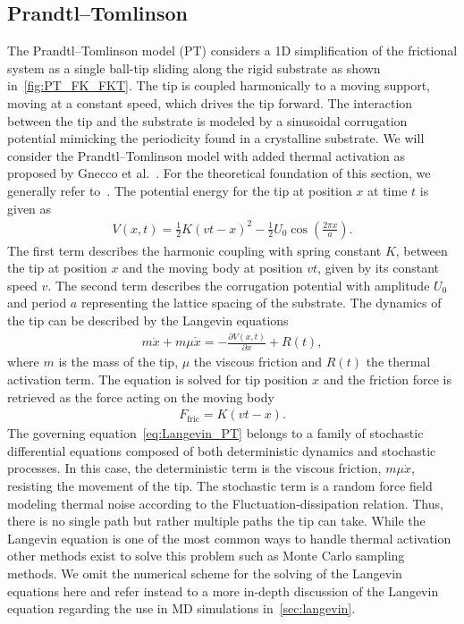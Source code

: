 \subsection{Prandtl–Tomlinson} %
The Prandtl–Tomlinson model (\acrshort{PT}) considers a 1D simplification of
the frictional system as a single ball-tip sliding along the rigid substrate as
shown in~\cref{fig:PT_FK_FKT}. The tip is coupled harmonically to a moving support, moving at a constant speed, which drives the tip forward. The interaction between
the tip and the substrate is modeled by a sinusoidal corrugation potential
mimicking the periodicity found in a crystalline substrate. We will consider the
Prandtl–Tomlinson model with added thermal activation as proposed by Gnecco et
al.~\cite{PhysRevLett.84.1172}. For the theoretical foundation of this section,
we generally refer to~\cite{Yalin_2011}. The potential energy for the tip at position $x$ at time $t$ is given as
\begin{align}
  V(x,t) = \frac{1}{2}K(vt - x)^2 - \frac{1}{2}U_0 \cos \left(\frac{2\pi x}{a} \right).
  \label{eq:V_PT}
\end{align}
The first term describes the harmonic coupling with spring constant $K$, between the tip at position $x$ and the moving body at position $vt$, given by its constant speed $v$. The second term describes the corrugation potential with amplitude $U_0$ and period $a$ representing the lattice spacing of the substrate. The dynamics of the tip can be described by the Langevin equations 
\begin{align}
  m \ddot{x}+m \mu \dot{x}=-\frac{\partial V(x, t)}{\partial x}+R(t),
  \label{eq:Langevin_PT}
\end{align}
where $m$ is the mass of the tip, $\mu$ the viscous friction and $R(t)$ the thermal activation term. The equation is solved for tip position $x$ and the friction force is retrieved as the force acting on the moving body
\begin{align*}
  F_{\text{fric}} = K(vt - x).
\end{align*}
The governing equation~\cref{eq:Langevin_PT} belongs to a family of stochastic differential equations composed of both deterministic dynamics and stochastic processes. In this case, the deterministic term is the viscous friction, $m\mu\dot{x}$, resisting the movement of the tip. The stochastic term is a random force field modeling thermal noise according to the Fluctuation-dissipation relation. Thus, there is no single path but rather multiple paths the tip can take. While the Langevin equation is one of the most common ways to handle thermal activation other methods exist to solve this problem such as Monte Carlo sampling methods. We omit the numerical scheme for the solving of the Langevin equations here and refer instead to a more in-depth discussion of the Langevin equation regarding the use in \acrshort{MD} simulations in~\cref{sec:langevin}. 


